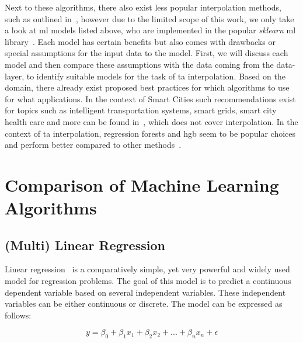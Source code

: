 Next to these algorithms, there also exist less popular interpolation methods, such as outlined in~\cite{li2014spatial}, however due to the limited scope of this work, we only take a look at \gls{ml} models listed above, who are implemented in the popular \textit{sklearn} \gls{ml} library~\cite{scikit-learn}.
Each model has certain benefits but also comes with drawbacks or special assumptions for the input data to the model. First, we will discuss each model and then compare these assumptions with the data coming from the data-layer, to identify suitable models for the task of \gls{ta} interpolation.
Based on the domain, there already exist proposed best practices for which algorithms to use for what applications. In the context of Smart Cities such recommendations exist for topics such as intelligent transportation systems, smart grids, smart city health care and more can be found in~\cite{ullah2020applications}, which does not cover interpolation. In the context of \gls{ta} interpolation, regression forests and \gls{hgb} seem to be popular choices and perform better compared to other methods~\cite{apaydin2022evaluation, ho2014mapping}.

\section{Comparison of Machine Learning Algorithms}
\label{sec:comparison ml algorithms}

\subsection{(Multi) Linear Regression}
\label{subsec: linear regression}

Linear regression~\cite{montgomery2021introduction} is a comparatively simple, yet very powerful and widely used model for regression problems. The goal of this model is to predict a continuous dependent variable based on several independent variables. These independent variables can be either continuous or discrete. The model can be expressed as follows:

\begin{equation}
    y = \beta_0 + \beta_1 x_1 + \beta_2 x_2 + ... + \beta_n x_n + \epsilon
\end{equation}

